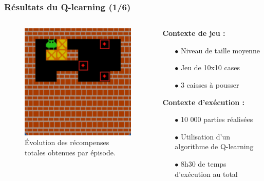 \documentclass[
	11pt, %
]{beamer}
\begin{document}
\begin{frame}
    \frametitle{Résultats du Q-learning (1/6)}
    \begin{columns}
        \begin{column}{0.4\textwidth}
            \begin{figure}
                \centering
                \includegraphics[width=\textwidth]{Images/imagejeux.png}
                \caption{Évolution des récompenses totales obtenues par épisode.}
            \end{figure}
        \end{column}
        \begin{column}{0.4\textwidth}
            \textbf{Contexte de jeu :}\\
            \begin{itemize}
                \item[$\bullet$] Niveau de taille moyenne
                \item[$\bullet$] Jeu de 10x10 cases
                \item[$\bullet$] 3 caisses à pousser
            \end{itemize}
            \vspace{0.5cm}
            \textbf{Contexte d'exécution :}\\
            \begin{itemize}
                \item[$\bullet$] 10 000 parties réalisées
                \item[$\bullet$] Utilisation d'un algorithme de Q-learning 
                \item[$\bullet$] 8h30 de temps d'exécution au total
            \end{itemize}
        \end{column}
    \end{columns}
\end{frame}
\end{document}
